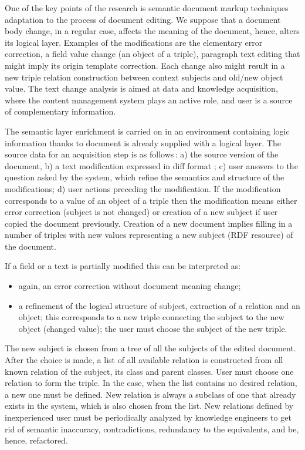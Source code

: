 \documentclass[utf8]{../IncArticle}
\begin{document}
One of the key points of the research is semantic document markup techniques adaptation to the process of document editing. We suppose that a document body change, in a regular case, affects the meaning of the document, hence, alters its logical layer. Examples of the modifications are the elementary error correction, a field value change (an object of a triple), paragraph text editing that might imply its origin template correction. Each change also might result in a new triple relation construction between context subjects and old/new object value. The text change analysis is aimed at data and knowledge acquisition, where the content management system plays an active role, and user is a source of complementary information.

The semantic layer enrichment is carried on in an environment containing logic information thanks to document is already supplied with a logical layer. The source data for an acquisition step is as follows\,: a) the source version of the document, b) a text modification expressed in diff format \cite{b9}; c) user answers to the question asked by the system, which refine the semantics and structure of the modifications; d) user actions preceding the modification. If the modification corresponds to a value of an object of a triple then the modification means either error correction (subject is not changed) or creation of a new subject if user copied the document previously. Creation of a new document implies filling in a number of triples with new values representing a new subject (RDF resource) of the document.

If a field or a text is partially modified this can be interpreted as:
\begin{itemize}
\item again, an error correction without document meaning change;
\item a refinement of the logical structure of subject, extraction of a relation and an object; this corresponds to a new triple connecting the subject to the new object (changed value); the user must choose the subject of the new triple.
\end{itemize}

The new subject is chosen from a tree of all the subjects of the edited document. After the choice is made, a list of all available relation is constructed from all known relation of the subject, its class and parent classes. User must choose one relation to form the triple. In the case, when the list contains no desired relation, a new one must be defined. New relation is always a subclass of one that already exists in the system, which is also chosen from the list. New relations defined by inexperienced user must be periodically analyzed by knowledge engineers to get rid of semantic inaccuracy, contradictions, redundancy to the equivalents, and be, hence, refactored.
\end{document}
